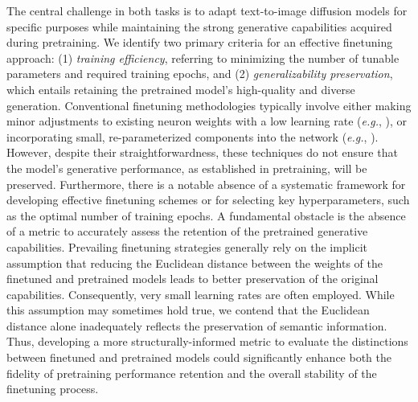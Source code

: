 The central challenge in both tasks is to adapt text-to-image diffusion models for specific purposes while maintaining the strong generative capabilities acquired during pretraining. We identify two primary criteria for an effective finetuning approach: (1) \emph{training efficiency}, referring to minimizing the number of tunable parameters and required training epochs, and (2) \emph{generalizability preservation}, which entails retaining the pretrained model's high-quality and diverse generation. Conventional finetuning methodologies typically involve either making minor adjustments to existing neuron weights with a low learning rate (\emph{e.g.}, \cite{ruiz2023dreambooth}), or incorporating small, re-parameterized components into the network (\emph{e.g.}, \cite{hulora2022,zhang2023adding}). However, despite their straightforwardness, these techniques do not ensure that the model’s generative performance, as established in pretraining, will be preserved. Furthermore, there is a notable absence of a systematic framework for developing effective finetuning schemes or for selecting key hyperparameters, such as the optimal number of training epochs. A fundamental obstacle is the absence of a metric to accurately assess the retention of the pretrained generative capabilities. Prevailing finetuning strategies generally rely on the implicit assumption that reducing the Euclidean distance between the weights of the finetuned and pretrained models leads to better preservation of the original capabilities. Consequently, very small learning rates are often employed. While this assumption may sometimes hold true, we contend that the Euclidean distance alone inadequately reflects the preservation of semantic information. Thus, developing a more structurally-informed metric to evaluate the distinctions between finetuned and pretrained models could significantly enhance both the fidelity of pretraining performance retention and the overall stability of the finetuning process.

